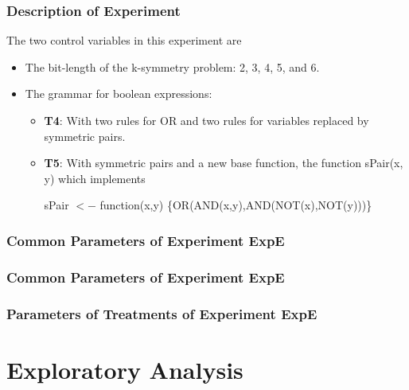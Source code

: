 \documentclass[18pt,c]{beamer}
\makeatletter
\let\beamer@writeslidentry@miniframeson=\beamer@writeslidentry
\newcommand*{\miniframeson}{\let\beamer@writeslidentry=\beamer@writeslidentry@miniframeson}
\makeatother
\begin{document}
\begin{frame}
\frametitle{
Description of Experiment
}
The two control variables in this experiment are
\begin{itemize}
\item The bit-length of the k-symmetry problem: 2, 3, 4, 5, and 6.
\item The grammar for boolean expressions:
\begin{itemize} 
\item {\bf T4}: With two rules for OR and two rules for variables replaced
            by symmetric pairs.
\item {\bf T5}: With symmetric pairs and a new base function,
       the function sPair(x, y) which implements
 
sPair $<-$ function(x,y) \{OR(AND(x,y),AND(NOT(x),NOT(y)))\}
\end{itemize}
\end{itemize}
\end{frame}%
 \begin{frame}
 \fontsize{8pt}{9pt}\selectfont
 \frametitle{ Common Parameters of Experiment ExpE }

 \label{ExpECommonTable000.tex}  
 \end{frame}

 \begin{frame}
 \fontsize{8pt}{9pt}\selectfont
 \frametitle{ Common Parameters of Experiment ExpE }

 \label{ExpECommonTable001.tex}  
 \end{frame}

 \begin{frame}
 \fontsize{8pt}{9pt}\selectfont
 \frametitle{ Parameters of Treatments of Experiment ExpE }

 \label{ExpEDifferentTable000.tex}  
 \end{frame}

\miniframeson
\section{Exploratory Analysis}
\miniframeson
\end{document}
